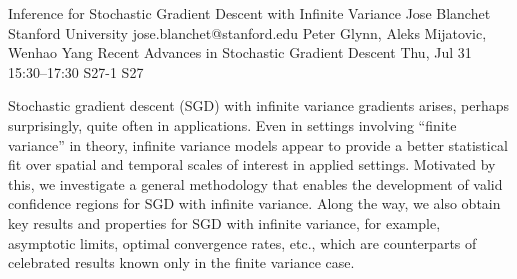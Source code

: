 \begin{talk}
  {Inference for Stochastic Gradient Descent with Infinite Variance}%
  {Jose Blanchet}%
  {Stanford University}%
  {jose.blanchet@stanford.edu}%
  {Peter Glynn, Aleks Mijatovic, Wenhao Yang}%
  {Recent Advances in Stochastic Gradient Descent}%
  {Thu, Jul 31 15:30–17:30}%
  {S27-1}%
  {S27}%
				
                
Stochastic gradient descent (SGD) with infinite variance gradients arises, perhaps surprisingly, quite often in applications. Even in settings involving “finite variance” in theory, infinite variance models appear to provide a better statistical fit over spatial and temporal scales of interest in applied settings. Motivated by this, we investigate a general methodology that enables the development of valid confidence regions for SGD with infinite variance. Along the way, we also obtain key results and properties for SGD with infinite variance, for example, asymptotic limits, optimal convergence rates, etc., which are counterparts of celebrated results known only in the finite variance case.


\medskip


\end{talk}

